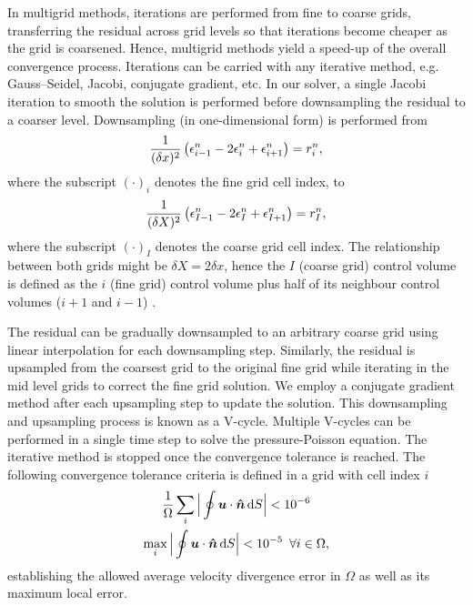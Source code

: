 \documentclass[../main.tex]{subfiles}
\begin{document}
In multigrid methods, iterations are performed from fine to coarse grids, transferring the residual across grid levels so that iterations become cheaper as the grid is coarsened.
Hence, multigrid methods yield a speed-up of the overall convergence process.
Iterations can be carried with any iterative method, e.g. Gauss--Seidel, Jacobi, conjugate gradient, etc.
In our solver, a single Jacobi iteration to smooth the solution is performed before downsampling the residual to a coarser level.
Downsampling (in one-dimensional form) is performed from
\begin{equation}
\frac{1}{(\delta x)^2}\left(\epsilon_{i-1}^n-2\epsilon_{i}^n+\epsilon_{i+1}^n \right)=r_i^n,
\end{equation}
where the subscript $(\cdot)_i$ denotes the fine grid cell index, to
\begin{equation}
\frac{1}{(\delta X)^2}\left(\epsilon_{I-1}^n-2\epsilon_{I}^n+\epsilon_{I+1}^n \right)=r_I^n,
\end{equation}
where the subscript $(\cdot)_I$ denotes the coarse grid cell index.
The relationship between both grids might be $\delta X = 2\delta x$, hence the $I$ (coarse grid) control volume is defined as the $i$ (fine grid) control volume plus half of its neighbour control volumes ($i+1$ and $i-1$) \citep{Ferziger2002}.

The residual can be gradually downsampled to an arbitrary coarse grid using linear interpolation for each downsampling step.
Similarly, the residual is upsampled from the coarsest grid to the original fine grid while iterating in the mid level grids to correct the fine grid solution.
We employ a conjugate gradient method after each upsampling step to update the solution.
This downsampling and upsampling process is known as a V-cycle.
Multiple V-cycles can be performed in a single time step to solve the pressure-Poisson equation.
The iterative method is stopped once the convergence tolerance is reached.
The following convergence tolerance criteria is defined in a grid with cell index $i$
\begin{gather}
\frac{1}{\Omega}\sum_i\Big|\oint \boldsymbol{u}\cdot\boldsymbol{\hat{n}}\,\mathrm{d}S\Big|<10^{-6}\\
\max_i\Big|\oint \boldsymbol{u}\cdot\boldsymbol{\hat{n}}\,\mathrm{d}S\Big|<10^{-5} \,\,\, \forall i \in \Omega ,
\end{gather}
establishing the allowed average velocity divergence error in $\Omega$ as well as its maximum local error.
\end{document}

